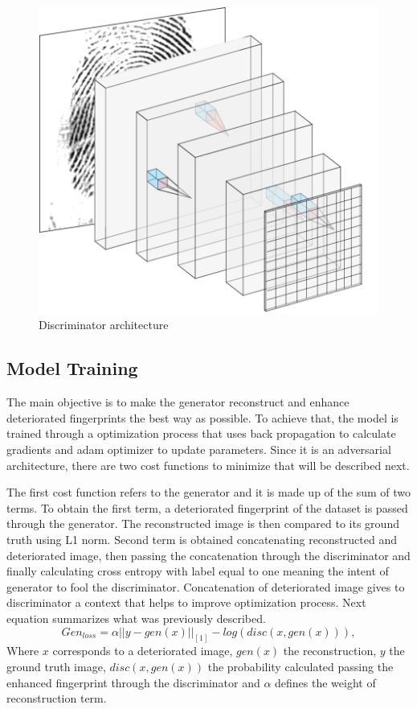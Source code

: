 \documentclass[a4paper,fleqn]{cas-dc}
\begin{document}
\begin{figure}[htbp]
\centerline{\includegraphics[scale=0.36]{figs/discriminador_p.png}}
\caption{Discriminator architecture}
\label{fig5}
\end{figure}

\subsection{Model Training}
\label{sec:MT}
The main objective is to make the generator reconstruct and enhance deteriorated fingerprints the best way as possible. To achieve that, the model is trained through a optimization process that uses back propagation to calculate gradients and adam optimizer to update parameters. Since it is an adversarial architecture, there are two cost functions to minimize that will be described next.

The first cost function refers to the generator and it is made up of the sum of two terms. To obtain the first term, a deteriorated fingerprint of the dataset is passed through the generator. The reconstructed image is then compared to its ground truth using L1 norm. Second term is obtained concatenating reconstructed and deteriorated image, then passing the concatenation through the discriminator and finally calculating cross entropy with label equal to one meaning the intent of generator to fool the discriminator. Concatenation of deteriorated image gives to discriminator a context that helps to improve optimization process. Next equation summarizes what was previously described.
\begin{equation}
    Gen_{loss} = \alpha||y-gen(x)||_{[1]} - log(disc(x,gen(x))),
\end{equation}
Where $x$ corresponds to a deteriorated image, $gen(x)$ the reconstruction, $y$ the ground truth image, $disc(x,gen(x))$ the probability calculated passing the enhanced fingerprint through the discriminator and $\alpha$ defines the weight of reconstruction term.
\end{document}
